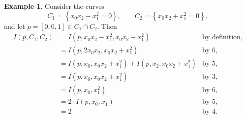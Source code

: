\documentclass{article}
\newcommand{\rb}[1]{\left( #1 \right)}
\renewcommand{\sb}[1]{\left[ #1 \right]}
\newcommand{\cb}[1]{\left\{ #1 \right\}}
\theoremstyle{definition}\newtheorem{definition}{Definition}[section]
\theoremstyle{definition}\newtheorem{notation}[definition]{Notation}
\theoremstyle{definition}\newtheorem{remark}[definition]{Remark}
\theoremstyle{definition}\newtheorem{example}[definition]{Example}
\theoremstyle{definition}\newtheorem{fact}{Fact}
\theoremstyle{definition}\newtheorem{exercise}{Exercise}
\begin{document}
\begin{example}
Consider the curves
$$ C_1 = \cb{x_0x_2 - x_1^2 = 0}, \qquad C_2 = \cb{x_0x_2 + x_1^2 = 0}, $$
and let $ p = \sb{0, 0, 1} \in C_1 \cap C_2 $. Then
\begin{align*}
I\rb{p, C_1, C_2}
& = I\rb{p, x_0x_2 - x_1^2, x_0x_2 + x_1^2} & \text{by definition}, \\
& = I\rb{p, 2x_0x_2, x_0x_2 + x_1^2} & \text{by } 6, \\
& = I\rb{p, x_0, x_0x_2 + x_1^2} + I\rb{p, x_2, x_0x_2 + x_1^2} & \text{by } 5, \\
& = I\rb{p, x_0, x_0x_2 + x_1^2} & \text{by } 3, \\
& = I\rb{p, x_0, x_1^2} & \text{by } 6, \\
& = 2 \cdot I\rb{p, x_0, x_1} & \text{by } 5, \\
& = 2 & \text{by } 4.
\end{align*}
\end{example}
\end{document}
